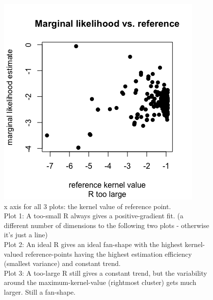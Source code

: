 \documentclass[%
 reprint,
 amsmath,amssymb,
 aps,
]{revtex4-2}
\begin{document}
\begin{figure}[h!]
    \includegraphics[scale=0.25]{figures/temporary/FItoolargeR.png}
    \caption{x axis for all 3 plots: the kernel value of reference point. \\
    Plot 1: A too-small R always gives a positive-gradient fit. (a different number of dimensions to the following two plots - otherwise it's just a line) \\
    Plot 2: An ideal R gives an ideal fan-shape with the highest kernel-valued reference-points having the highest estimation efficiency (smallest variance) and constant trend. \\
    Plot 3: A too-large R still gives a constant trend, but the variability around the maximum-kernel-value (rightmost cluster) gets much larger. Still a fan-shape.}
    \label{fig:temporary-kernelval-vs-estimate}
\end{figure}

\end{document}
